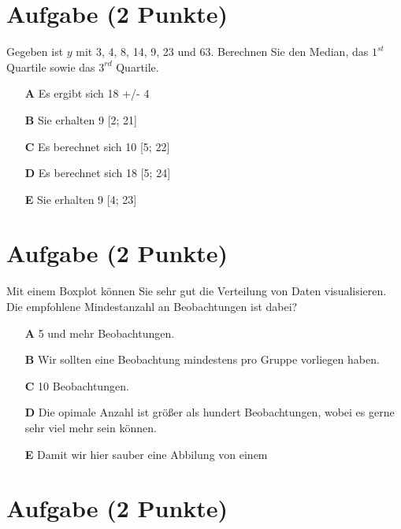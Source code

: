 \documentclass[a4paper, 9pt]{scrartcl}\usepackage[]{graphicx}\usepackage[]{xcolor}
\begin{document}
\section{Aufgabe \hfill (2 Punkte)}




Gegeben ist $y$ mit 3, 4, 8, 14, 9, 23 und 63. Berechnen Sie den Median, das $1^{st}$ Quartile sowie das $3^{rd}$ Quartile.




\begin{enumerate}
\item [\textbf{A} \msquare] Es ergibt sich 18 +/- 4
\item [\textbf{B} \msquare] Sie erhalten 9 [2; 21]
\item [\textbf{C} \msquare] Es berechnet sich 10 [5; 22]
\item [\textbf{D} \msquare] Es berechnet sich 18 [5; 24]
\item [\textbf{E} \msquare] Sie erhalten 9 [4; 23]
\end{enumerate} 

\section{Aufgabe \hfill (2 Punkte)}



Mit einem Boxplot  können Sie sehr gut die Verteilung von Daten visualisieren. Die empfohlene Mindestanzahl an Beobachtungen ist dabei?



\begin{enumerate}
\item [\textbf{A} \msquare] 5 und mehr Beobachtungen.
\item [\textbf{B} \msquare] Wir sollten eine Beobachtung mindestens pro Gruppe vorliegen haben.
\item [\textbf{C} \msquare] 10 Beobachtungen.
\item [\textbf{D} \msquare] Die opimale Anzahl ist größer als hundert Beobachtungen, wobei es gerne sehr viel mehr sein können.
\item [\textbf{E} \msquare] Damit wir hier sauber eine Abbilung von einem 
\end{enumerate}

\section{Aufgabe \hfill (2 Punkte)}
\end{document}
